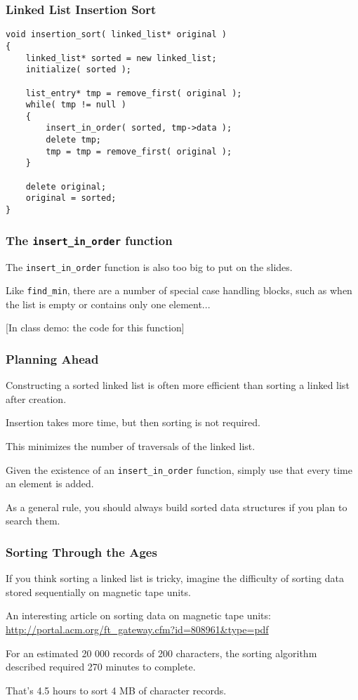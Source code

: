\begin{frame}[fragile]
\frametitle{Linked List Insertion Sort}

\begin{verbatim}
void insertion_sort( linked_list* original )
{
    linked_list* sorted = new linked_list;
    initialize( sorted );

    list_entry* tmp = remove_first( original );
    while( tmp != null )
    {
        insert_in_order( sorted, tmp->data );
        delete tmp;
        tmp = tmp = remove_first( original );
    }
  
    delete original;
    original = sorted;
}
\end{verbatim}

\end{frame}


\begin{frame}[fragile]
\frametitle{The \texttt{insert\_in\_order} function}
The \texttt{insert\_in\_order} function is also too big to put on the slides.

Like \texttt{find\_min}, there are a number of special case handling blocks, such as when the list is empty or contains only one element...

[In class demo: the code for this function]

\end{frame}

\begin{frame}
\frametitle{Planning Ahead}

Constructing a sorted linked list is often more efficient than sorting a linked list after creation.

Insertion takes more time, but then sorting is not required.

This minimizes the number of traversals of the linked list.

Given the existence of an \texttt{insert\_in\_order} function, simply use that every time an element is added.

As a general rule, you should always build sorted data structures if you plan to search them.


\end{frame}


\begin{frame}
\frametitle{Sorting Through the Ages}
If you think sorting a linked list is tricky, imagine the difficulty of sorting data stored sequentially on magnetic tape units.

An interesting article on sorting data on magnetic tape units:
\url{http://portal.acm.org/ft_gateway.cfm?id=808961&type=pdf}
	
For an estimated 20 000 records of 200 characters, the sorting algorithm described required 270 minutes to complete.

That's 4.5 hours to sort 4 MB of character records.
\end{frame}

